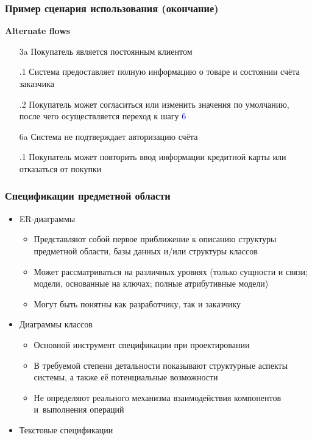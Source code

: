 \documentclass{softengineering-lectures}
\begin{document}
\begin{frame}
  \frametitle{Пример сценария использования (окончание)}

  \textbf{Alternate flows}
  \begin{enumerate}
  \item[3a] Покупатель является постоянным клиентом
  \item[.1] Система предоставляет полную информацию о товаре и состоянии счёта заказчика
  \item[.2] Покупатель может согласиться или изменить значения по умолчанию,
    после чего осуществляется переход к шагу \textcolor{blue}{6}
  \item[6a] Система не подтверждает авторизацию счёта
  \item[.1] Покупатель может повторить ввод информации кредитной карты или
    отказаться от покупки
  \end{enumerate}
\end{frame}

\begin{frame} \frametitle{Спецификации предметной области}

  \begin{itemize}
  \item ER-диаграммы
    \begin{itemize}
    \item Представляют собой первое приближение к описанию структуры предметной
      области, базы данных и/или структуры классов
    \item Может рассматриваться на различных уровнях (только сущности и связи;
      модели, основанные на ключах; полные атрибутивные модели)
    \item Могут быть понятны как разработчику, так и заказчику
    \end{itemize}
  \item Диаграммы классов
    \begin{itemize}
    \item Основной инструмент спецификации при проектировании
    \item В требуемой степени детальности показывают структурные аспекты
      системы, а также её потенциальные возможности
    \item Не определяют реального механизма взаимодействия компонентов
      и~выполнения операций
    \end{itemize}
  \item Текстовые спецификации
  \end{itemize}
  
\end{frame}
\end{document}

